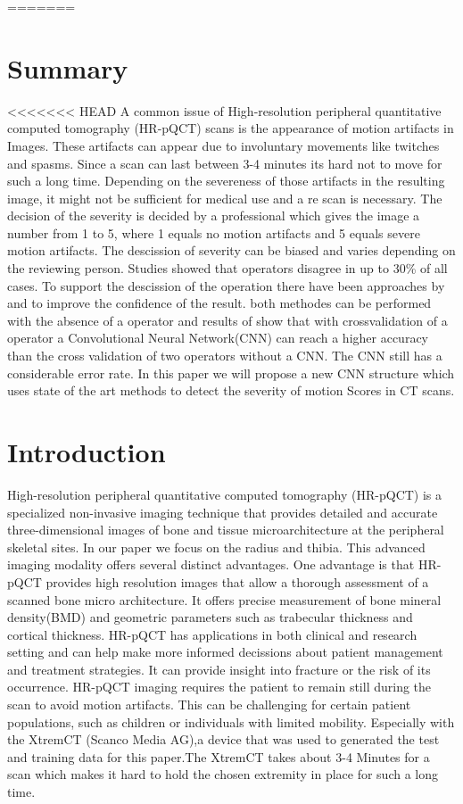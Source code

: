 \documentclass[
a4paper, 
12pt,
grayscalebody, %
abstract=on,
twoside, BCOR10mm, 12pt, DIV13,headinclude, footexclude, final, abstracton, openright
]{ibireprt}
\numberwithin{equation}{chapter}
\numberwithin{table}{chapter}
\numberwithin{figure}{chapter}
\numberwithin{algorithm}{chapter}
\numberwithin{example}{chapter}
\numberwithin{example}{chapter}
\begin{document}


=======
\chapter*{Summary}
<<<<<<< HEAD
	A common issue of High-resolution peripheral quantitative computed tomography (HR-pQCT) scans is the appearance of motion artifacts in Images. These artifacts can appear due to involuntary movements like twitches and spasms. Since a scan can last between 3-4 minutes its hard not to move for such a long time. Depending on the severeness of those artifacts in the resulting image, it might not be sufficient for medical use and a re scan is necessary. The decision of the severity is decided by a professional which gives the image a number from 1 to 5, where 1 equals no motion artifacts and 5 equals severe motion artifacts. The descission of severity can be biased and varies depending on the reviewing person. Studies showed that operators disagree in up to 30\% of all cases.
	 To support the descission of the operation there have been approaches by \cite{Sode2011} and \cite{Walle2023}  to improve the confidence of the result. both methodes can be performed with the absence of a operator and results of \cite{Sode2011} show that with crossvalidation of a operator  a Convolutional Neural Network(CNN) can reach a higher accuracy than the cross validation of two operators without a CNN. The CNN still has a considerable error rate. In this paper we will propose a new CNN structure which uses state of the art methods to detect the severity of motion Scores in CT scans. 

\chapter{Introduction}

High-resolution peripheral quantitative computed tomography (HR-pQCT) is a specialized non-invasive imaging technique that provides detailed and accurate three-dimensional images of bone and tissue microarchitecture at the peripheral skeletal sites. In our paper we focus  on the radius and thibia. This advanced imaging modality offers several distinct advantages. One advantage is that HR-pQCT provides high resolution images that allow a thorough assessment of a scanned bone micro architecture. It offers precise measurement of bone mineral density(BMD) and geometric parameters such as trabecular thickness and cortical thickness. HR-pQCT has applications in both clinical and research setting and can help make more informed decissions about patient management and treatment strategies. It can provide insight into fracture or the risk of its occurrence. HR-pQCT imaging requires the patient to remain still during the scan to avoid motion artifacts. This can be challenging for certain patient populations, such as children or individuals with limited  mobility. Especially with the XtremCT (Scanco Media AG),a device that  was used to generated the test and training data for this paper.The XtremCT takes about 3-4 Minutes for a scan which makes it hard to hold the chosen extremity in place for such a long time.
\end{document}
